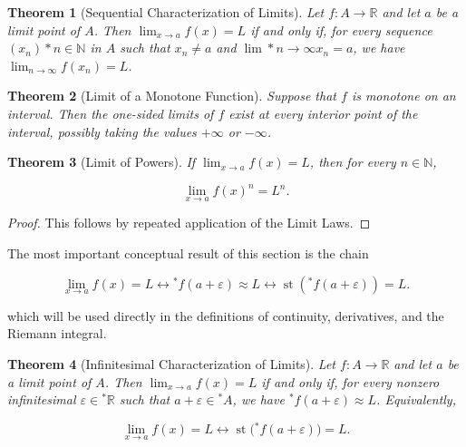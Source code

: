\documentclass[10pt,a4paper]{book}
\newtheorem{theorem}{Theorem}[section]
\begin{document}
\begin{theorem}[Sequential Characterization of Limits]

    Let $f:A\to\mathbb R$ and let $a$ be a limit point of $A$. Then $\lim_{x\to
            a}f(x)=L$ if and only if, for every sequence $(x_n)*{n\in\mathbb N}$ in $A$
    such that $x_n\neq a$ and $\lim*{n\to\infty}x_n=a$, we have
    $\lim_{n\to\infty}f(x_n)=L$.

\end{theorem}

\begin{theorem}[Limit of a Monotone Function]

    Suppose that $f$ is monotone on an interval. Then the one-sided limits of $f$
    exist at every interior point of the interval, possibly taking the values
    $+\infty$ or $-\infty$.

\end{theorem}

\begin{theorem}[Limit of Powers]

    If $\lim_{x\to a}f(x)=L$, then for every $n\in\mathbb N$,

    $$
        \lim_{x\to a}f(x)^n=L^n.
    $$

\end{theorem}

\begin{proof}

    This follows by repeated application of the Limit Laws.

\end{proof}

The most important conceptual result of this section is the chain

$$
    \lim_{x\to a}f(x)=L\leftrightarrow{}^*f(a+\varepsilon)\approx L\leftrightarrow\operatorname{st}({}^*f(a+\varepsilon))=L.
$$

which will be used directly in the definitions of continuity, derivatives, and
the Riemann integral.

\begin{theorem}[Infinitesimal Characterization of Limits]

    Let $f:A\to\mathbb R$ and let $a$ be a limit point of $A$. Then $\lim_{x\to
            a}f(x)=L$ if and only if, for every nonzero infinitesimal
    $\varepsilon\in{}^*\mathbb R$ such that $a+\varepsilon\in{}^*A$, we have
    ${}^*f(a+\varepsilon)\approx L$. Equivalently,

    $$
        \lim_{x\to a}f(x)=L\leftrightarrow\operatorname{st}\bigl({}^*f(a+\varepsilon)\bigr)=L.
    $$

\end{theorem}
\end{document}
